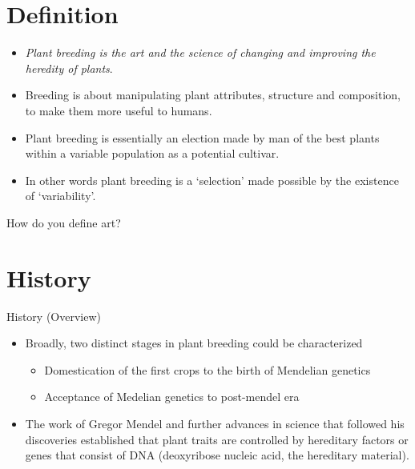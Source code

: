 \documentclass[11pt,ignorenonframetext,aspectratio=169]{beamer}
\providecommand{\tightlist}{%
  \setlength{\itemsep}{0pt}\setlength{\parskip}{0pt}}
\begin{document}
\hypertarget{definition}{%
\section{Definition}\label{definition}}

\begin{frame}{}
\protect\hypertarget{section-6}{}
\begin{itemize}
\item
  \emph{Plant breeding is the art and the science of changing and
  improving the heredity of plants}.
\item
  Breeding is about manipulating plant attributes, structure and
  composition, to make them more useful to humans.
\item
  Plant breeding is essentially an election made by man of the best
  plants within a variable population as a potential cultivar.
\item
  In other words plant breeding is a `selection' made possible by the
  existence of `variability'.
\end{itemize}
\end{frame}

\begin{frame}{How do you define art?}
\protect\hypertarget{how-do-you-define-art}{}
\end{frame}

\hypertarget{history}{%
\section{History}\label{history}}

\begin{frame}{History (Overview)}
\protect\hypertarget{history-overview}{}
\begin{itemize}
\tightlist
\item
  Broadly, two distinct stages in plant breeding could be characterized

  \begin{itemize}
  \tightlist
  \item
    Domestication of the first crops to the birth of Mendelian genetics
  \item
    Acceptance of Medelian genetics to post-mendel era
  \end{itemize}
\item
  The work of Gregor Mendel and further advances in science that
  followed his discoveries established that plant traits are controlled
  by hereditary factors or genes that consist of DNA (deoxyribose
  nucleic acid, the hereditary material).
\end{itemize}
\end{frame}
\end{document}
